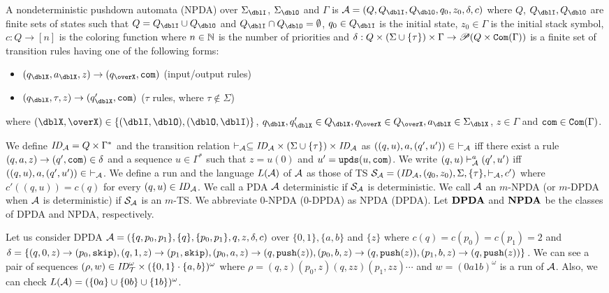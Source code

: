 \begin{definition}
A nondeterministic {pushdown automata} (NPDA) over $\Sigma_\dblI$, $\Sigma_\dblO$ and $\Gamma$ is $\calA = (Q, Q_\dblI, Q_\dblO, q_0, z_0, \delta, c)$ where
$Q$, $Q_\dblI, Q_\dblO$ are finite sets of states such that $Q=Q_\dblI\cup Q_\dblO$ and $Q_\dblI \cap Q_\dblO = \emptyset$,
$q_0\in Q_\dblI$ is the initial state,
$z_0\in \Gamma$ is the initial stack symbol,
$c: Q \to [n]$ is the coloring function where $n\in \mathbb{N}$ is the number of priorities and
$\delta: Q \times (\Sigma\cup\{\tau\}) \times \Gamma \to \mathscr{P}(Q \times \mathtt{Com}(\Gamma))$ is a finite set of transition rules having one of the following forms:
\begin{itemize}
\item $(q_\dblX, a_\dblX, z) \rightarrow (q_\overX, \com)$ (input/output rules)
\item $(q_\dblX, \tau, z)\to(q'_\dblX,\com)$ ($\tau$ rules, where $\tau\notin\Sigma$)
\end{itemize}
where $(\dblX, \overX)\in\{(\dblI, \dblO), (\dblO,\dblI)\}$,
$q_\dblX, q'_\dblX\in Q_\dblX, q_\overX\in Q_\overX, a_\dblX\in \Sigma_\dblX$, $z\in \Gamma$ and $\mathtt{com}\in \mathtt{Com}(\Gamma)$.
\end{definition}
We define $\mathit{ID}_{\cal A}= Q\times \Gamma^*$ and
the transition relation $\vdash_{\cal A}\subseteq \mathit{ID}_{\cal A}\times (\Sigma\cup\{\tau\})\times \mathit{ID}_{\cal A}$ as
$((q,u),a,(q',u'))\in\ \vdash_{\cal A}$ iff there exist a rule $(q, a, z) \rightarrow (q', \mathtt{com}) \in \delta$ and a sequence $u\in \Gamma^*$ such that $z=u(0)$ and $u'=\mathtt{upds}(u,\mathtt{com})$.
We write $(q,u)\vdash^a_{\cal A}(q',u')$ iff
$((q,u),a,(q',u'))\in\ \vdash_{\cal A}$.
We define a run and the language $L({\cal A})$ of ${\cal A}$ as those of TS ${\cal S}_{\cal A}=(\mathit{ID}_{\cal A}, (q_0,z_0),\Sigma, \{\tau\},\vdash_{\cal A},c')$
where $c'((q,u))= c(q)$ for every $(q,u)\in\mathit{ID}_{\cal A}$.
We call a PDA ${\cal A}$ deterministic if ${\cal S}_{\cal A}$ is deterministic.
We call ${\cal A}$ an $m$-NPDA (or $m$-DPDA when ${\cal A}$ is deterministic)
if ${\cal S}_{\cal A}$ is an $m$-TS.
We abbreviate $0$-NPDA ($0$-DPDA) as NPDA (DPDA).
Let ${\bf DPDA}$ and ${\bf NPDA}$ be the classes of DPDA and NPDA, respectively.

\begin{example}
\label{ex: PDA}
Let us consider DPDA
${\cal A} = (\{q,p_0,p_1\},\{q\},\{p_0,p_1\},q,z,\delta,c)$
over $\{0,1\},\{a,b\}$ and $\{z\}$ where
$c(q)=c(p_0)=c(p_1)=2$ and
$\delta = \{
(q, 0, z) \rightarrow (p_0, \mathtt{skip}),
(q, 1, z) \rightarrow (p_1, \mathtt{skip}),
(p_0, a, z) \rightarrow (q, \mathtt{push}(z)),
(p_0, b, z) \rightarrow (q, \mathtt{push}(z)),
(p_1, b, z) \rightarrow (q, \mathtt{push}(z))
\}$.
We can see
a pair of sequences $(\rho,w)\in \mathit{ID}_{\cal T}^\omega\times (\{0,1\}\cdot\{a,b\})^\omega$ where
$\rho=(q,z)(p_0,z)(q,zz)(p_1,zz)\cdots$ and
$w=(0a1b)^\omega$
is a run of ${\cal A}$.
Also, we can check
$L({\cal A})=(\{0a\}\cup\{0b\}\cup\{1b\})^\omega$.
\end{example}

